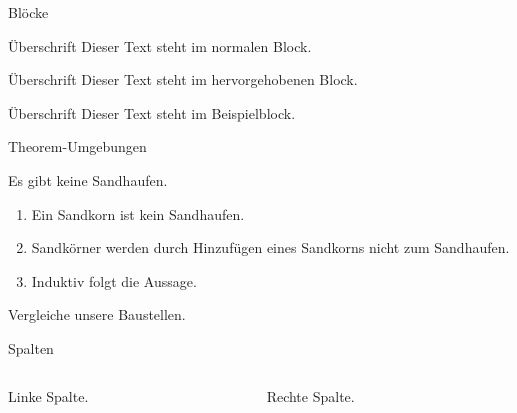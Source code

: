 \documentclass{beamer}
\begin{document}
  \begin{frame}{Blöcke}
    \begin{block}{Überschrift}
      Dieser Text steht im normalen Block.
    \end{block}

    \begin{alertblock}{Überschrift}
      Dieser Text steht im hervorgehobenen Block.
    \end{alertblock}

    \begin{exampleblock}{Überschrift}
      Dieser Text steht im Beispielblock.
    \end{exampleblock}
  \end{frame}

  \begin{frame}{Theorem-Umgebungen}
    \begin{Satz}[Sandhaufensatz]
      Es gibt keine Sandhaufen.
    \end{Satz}

    \begin{Beweis}
      \begin{enumerate}
        \item Ein Sandkorn ist kein Sandhaufen.
        \item Sandkörner werden durch Hinzufügen
          eines Sandkorns nicht zum Sandhaufen.
        \item Induktiv folgt die Aussage. \qedhere
      \end{enumerate}
    \end{Beweis}

    \begin{Beispiel}
      Vergleiche unsere Baustellen.
    \end{Beispiel}
  \end{frame}

  \begin{frame}{Spalten}
    \begin{columns}
      \begin{column}{5cm}
        Linke Spalte.
      \end{column}
      \begin{column}{5cm}
        Rechte Spalte.
      \end{column}
    \end{columns}
  \end{frame}
\end{document}
